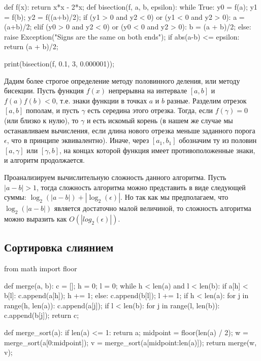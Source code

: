 \begin{python}
def f(x):
	return x*x - 2*x;
def bisection(f, a, b, epsilon):
	while True:
		y0 = f(a);
		y1 = f(b);
		y2 = f((a+b)/2);
		if (y1 > 0 and y2 < 0) or (y1 < 0 and y2 > 0):
			a = (a+b)/2;
		elif (y0 > 0 and y2 < 0) or (y0 < 0 and y2 > 0):
			b = (a + b)/2;
		else:
			raise Exception("Signs are the same on both ends");
		if abs(a-b) <= epsilon:
			return (a + b)/2;

print(bisection(f, 0.1, 3, 0.000001));
\end{python}

Дадим более строгое определение методу половинного 
деления, или методу бисекции. Пусть функция $f(x)$ непрерывна
на интервале $[a, b]$ и $f(a)f(b)<0$, т.е. знаки функции
в точках $a$ и $b$ разные. Разделим отрезок $[a, b]$ пополам,
и пусть $\gamma$ есть середина этого отрезка. Тогда, если
$f(\gamma) = 0$ (или близко к нулю), то $\gamma$ и есть
искомый корень (в нашем же случае мы останавливаем вычисления,
если длина нового отрезка меньше заданного порога $\epsilon$, что в принципе
эквивалентно). Иначе, через $[a_1, b_1]$ обозначим ту из половин
$[a, \gamma]$ или $[\gamma, b]$, на концах которой функция имеет
противоположенные знаки, и алгоритм продолжается.


Проанализируем вычислительную сложность данного алгоритма. 
Пусть $|a-b|>1$, тогда сложность алгоритма можно представить в виде 
следующей суммы: $\log_2(|a-b|) + |\log_2(\epsilon)|$. Но так как 
мы предполагаем, что $\log_2(|a-b|)$ является достаточно 
малой величиной, то сложность алгоритма можно выразить как 
$O(|log_2(\epsilon)|)$.


\subsection{Сортировка слиянием}

\begin{python}

from math import floor

def merge(a, b):
	c = [];
	h = 0;
	l = 0;
	while h < len(a) and l < len(b):
		if a[h] < b[l]:
			c.append(a[h]);
			h += 1;
		else:
			c.append(b[l]);
			l += 1;
	if h < len(a):
		for j in range(h, len(a)):
			c.append(a[j]);
	if l < len(b):
		for j in range(l, len(b)):
			c.append(b[j]);
	return c;

def merge_sort(a):
	if len(a) <= 1:
		return a;
	midpoint = floor(len(a) / 2);
	w = merge_sort(a[0:midpoint]);
	v = merge_sort(a[midpoint:len(a)]);
	return merge(w, v);
\end{python}

